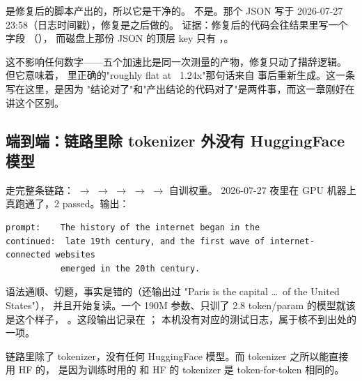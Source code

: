 \begin{misconception}{ 是修复后的脚本产出的，所以它是干净的。}
不是。那个 JSON 写于 2026-07-27 23:58（日志时间戳），修复是之后做的。
证据：修复后的代码会往结果里写一个  字段
（），
而磁盘上那份 JSON 的顶层 key 只有
，。

这不影响任何数字——五个加速比是同一次测量的产物，修复只动了措辞逻辑。
但它意味着，
 里正确的"roughly flat at ~1.24x"那句话来自
 事后重新生成。这一条写在这里，是因为
"结论对了"和"产出结论的代码对了"是两件事，而这一章刚好在讲这个区别。
\end{misconception}

\subsection{端到端：链路里除 tokenizer 外没有 HuggingFace 模型}
\label{sec:b-kv-e2e}

 走完整条链路：
 $\to$  $\to$  $\to$
 $\to$  $\to$ 自训权重。
2026-07-27 夜里在 GPU 机器上真跑通了，2 passed。输出：

\begin{lstlisting}[style=hlshell]
prompt:    The history of the internet began in the
continued:  late 19th century, and the first wave of internet-connected websites
           emerged in the 20th century.
\end{lstlisting}

语法通顺、切题，事实是错的（还输出过 "Paris is the capital \ldots\ of the United States"），
并且开始复读。一个 190M 参数、只训了 2.8 token/param 的模型就该是这个样子，
。这段输出记录在 ；
本机没有对应的测试日志，属于核不到出处的一项。

链路里除了 tokenizer，没有任何 HuggingFace 模型。而 tokenizer 之所以能直接用 HF 的，
是因为训练时用的  和 HF 的  tokenizer
是 token-for-token 相同的。

